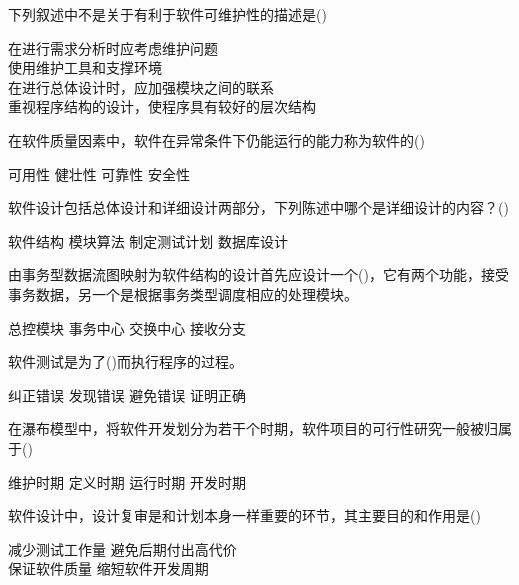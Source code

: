 \documentclass{exam}
\begin{document}
\begin{questions}
	\question 下列叙述中不是关于有利于软件可维护性的描述是()\\
	\begin{oneparchoices}
		\choice 在进行需求分析时应考虑维护问题\\
		\choice 使用维护工具和支撑环境\\
		\correctchoice 在进行总体设计时，应加强模块之间的联系\\
		\choice 重视程序结构的设计，使程序具有较好的层次结构
	\end{oneparchoices}
	\question 在软件质量因素中，软件在异常条件下仍能运行的能力称为软件的()\\
	\begin{oneparchoices}
		\choice 可用性
		\correctchoice 健壮性
		\choice 可靠性
		\choice 安全性
	\end{oneparchoices}
	\question 软件设计包括总体设计和详细设计两部分，下列陈述中哪个是详细设计的内容？()\\
	\begin{oneparchoices}
		\choice 软件结构
		\correctchoice 模块算法
		\choice 制定测试计划
		\choice 数据库设计
	\end{oneparchoices}
	\question 由事务型数据流图映射为软件结构的设计首先应设计一个()，它有两个功能，接受事务数据，另一个是根据事务类型调度相应的处理模块。\\
	\begin{oneparchoices}
		\choice 总控模块
		\correctchoice 事务中心
		\choice 交换中心
		\choice 接收分支
	\end{oneparchoices}
	\question 软件测试是为了()而执行程序的过程。\\
	\begin{oneparchoices}
		\choice 纠正错误
		\correctchoice 发现错误
		\choice 避免错误
		\choice 证明正确
	\end{oneparchoices}
	\question 在瀑布模型中，将软件开发划分为若干个时期，软件项目的可行性研究一般被归属于()\\
	\begin{oneparchoices}
		\choice 维护时期
		\correctchoice 定义时期
		\choice 运行时期
		\choice 开发时期
	\end{oneparchoices}
	\question 软件设计中，设计复审是和计划本身一样重要的环节，其主要目的和作用是()\\
	\begin{oneparchoices}
		\choice 减少测试工作量
		\choice 避免后期付出高代价\\
		\correctchoice 保证软件质量
		\choice 缩短软件开发周期
	\end{oneparchoices}

\end{questions}
\end{document}
